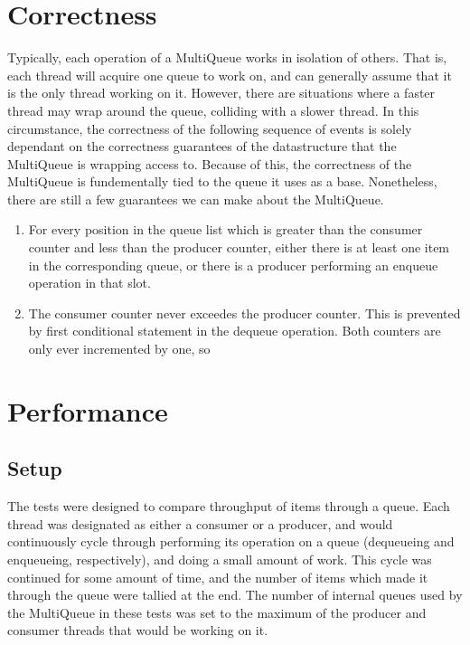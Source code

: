 \documentclass[12pt]{report}
\begin{document}
\begin{small}
\begin{algorithm}[H]
{}
\end{algorithm}
\end{small}

\section{Correctness}
Typically, each operation of a MultiQueue works in isolation of others. That
is, each thread will acquire one queue to work on, and can generally assume
that it is the only thread working on it. However, there are situations where a
faster thread may wrap around the queue, colliding with a slower thread. In
this circumstance, the correctness of the following sequence of events is
solely dependant on the correctness guarantees of the datastructure that the
MultiQueue is wrapping access to. Because of this, the correctness of the
MultiQueue is fundementally tied to the queue it uses as a base. Nonetheless,
there are still a few guarantees we can make about the MultiQueue.

\begin{enumerate}
\item For every position in the queue list which is greater than the consumer
counter and less than the producer counter, either there is at least one item
in the corresponding queue, or there is a producer performing an enqueue
operation in that slot. 

\item The consumer counter never exceedes the producer counter. This is
prevented by first conditional statement in the dequeue operation. Both
counters are only ever incremented by one, so 
\end{enumerate}

\section{Performance}
\subsection{Setup}
The tests were designed to compare throughput of items through a queue. Each
thread was designated as either a consumer or a producer, and would
continuously cycle through performing its operation on a queue (dequeueing and
enqueueing, respectively), and doing a small amount of work. This cycle was
continued for some amount of time, and the number of items which made it
through the queue were tallied at the end. The number of internal queues used
by the MultiQueue in these tests was set to the maximum of the producer and
consumer threads that would be working on it.
\end{document}
